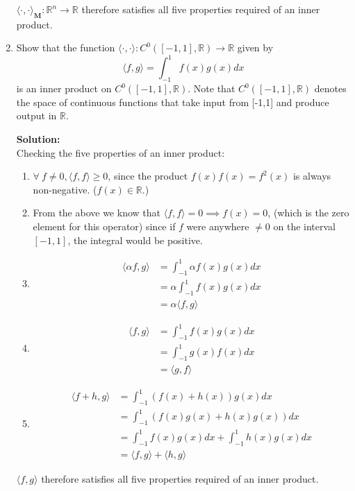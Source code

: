 \documentclass[]{article}
\newcommand{\R}{\mathbb{R}}				%
\newcommand{\la}{\langle}				%
\newcommand{\ra}{\rangle}				%
\newcommand{\solution}{\vskip 0.5cm \textbf{\large Solution:} \\}
\begin{document}
\begin{enumerate}[resume]
      $\la\cdot,\cdot\ra_{\bm{M}}:\R^n\to\R$ therefore satisfies all
      five properties required of an inner product.

	\item Show that the function $\la\cdot,\cdot\ra:C^0([-1,1],\R)\to\R$ given by 
	  \[
	  \la f,g\ra = \int^1_{-1}f(x)g(x)dx
	  \]
	  is an inner product on $C^0([-1,1],\R)$. Note that $C^0([-1,1],\R)$ denotes the space of continuous functions that take input from [-1,1] and produce output in $\R$.

	  \solution Checking the five properties of an inner product:
      \begin{enumerate}
      \item $\forall~f \neq 0, \la f,f\ra \geq 0$, since the product $f(x)f(x) = f^2(x)$ is always non-negative. ($f(x) \in \R$.)

      \item From the above we know that $\la f,f\ra = 0 \implies f(x)
        = 0$, (which is the zero element for this operator) since if
        $f$ were anywhere $\neq 0$ on the interval $[-1,1]$, the
        integral would be positive.

      \item 
        \[\begin{split}
        \la \alpha f,g\ra &= \int^1_{-1}\alpha f(x)g(x)dx \\
         &= \alpha \int^1_{-1}f(x)g(x)dx \\
         &= \alpha \la f,g\ra
        \end{split}\]
        
      \item
        \[\begin{split}
        \la f,g\ra &= \int^1_{-1} f(x)g(x)dx \\
         &= \int^1_{-1}g(x)f(x)dx \\
         &= \la g,f\ra
        \end{split}\]
        
      \item
        \[\begin{split}
        \la f + h,g\ra &= \int^1_{-1} (f(x) + h(x))g(x)dx \\
        &= \int^1_{-1} (f(x)g(x) + h(x)g(x))dx \\
        &= \int^1_{-1} f(x)g(x) dx + \int^1_{-1} h(x)g(x) dx \\
        &= \la f,g\ra + \la h,g\ra 
        \end{split}\]

      \end{enumerate}

      $\la f,g \ra$ therefore satisfies all five properties required of an inner product.

    \end{enumerate}
\end{document}
